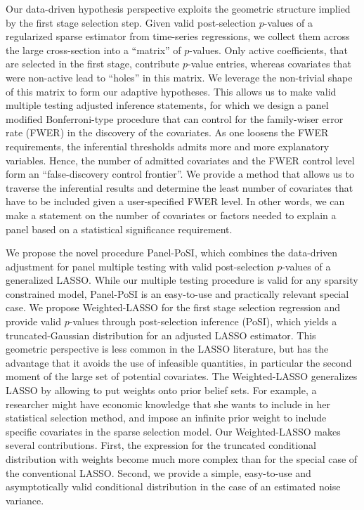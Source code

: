 \documentclass[11pt]{article}
\begin{document}
	
	
	Our data-driven hypothesis perspective exploits the geometric structure implied by the first stage selection step. Given valid post-selection $p$-values of a regularized sparse estimator from time-series regressions, we collect them across the large cross-section into a ``matrix'' of $p$-values.  Only active coefficients, that are selected in the first stage, contribute $p$-value entries, whereas covariates that were non-active lead to ``holes'' in this matrix. We leverage the non-trivial shape of this matrix to form our adaptive hypotheses. This allows us to make valid multiple testing adjusted inference statements, for which we design a panel modified Bonferroni-type procedure that can control for the family-wiser error rate (FWER) in the discovery of the covariates. As one loosens the FWER requirements, the inferential thresholds admits more and more explanatory variables. Hence, the number of admitted covariates and the FWER control level form an ``false-discovery control frontier''. We provide a method that allows us to traverse the inferential results and determine the least number of covariates that have to be included given a user-specified FWER level. In other words, we can make a statement on the number of covariates or factors needed to explain a panel based on a statistical significance requirement. %
	
	
	
	
	We propose the novel procedure Panel-PoSI, which combines the data-driven adjustment for panel multiple testing with valid post-selection $p$-values of a generalized LASSO. While our multiple testing procedure is valid for any sparsity constrained model, Panel-PoSI is an easy-to-use and practically relevant special case. We propose Weighted-LASSO for the first stage selection regression and provide valid $p$-values through post-selection inference (PoSI), which yields a truncated-Gaussian distribution for an adjusted LASSO estimator. This geometric perspective is less common in the LASSO literature, but has the advantage that it avoids the use of infeasible quantities, in particular the second moment of the large set of potential covariates. The Weighted-LASSO generalizes LASSO by allowing to put weights onto prior belief sets. For example, a researcher might have economic knowledge that she wants to include in her statistical selection method, and impose an infinite prior weight to include specific covariates in the sparse selection model. Our Weighted-LASSO makes several contributions. First, the expression for the truncated conditional distribution with weights become much more complex than for the special case of the conventional LASSO. Second, we provide a simple, easy-to-use and asymptotically valid conditional distribution in the case of an estimated noise variance. 
	
\end{document}
